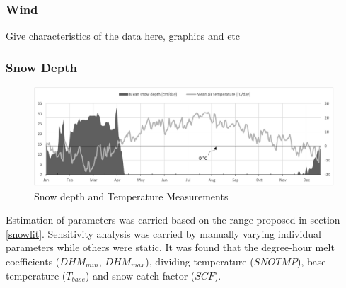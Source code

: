         \subsubsection{Wind}
        Give characteristics of the data here, graphics and etc


\subsubsection{Snow Depth}

\begin{figure}[h]
    \centering
	\includegraphics[scale=0.45]{figures/measuredsnowpack.png}
	\caption{Snow depth and Temperature Measurements \citet{fmidata}}
	\label{fig:snowmeasurement}
\end{figure}
        
Estimation of parameters was carried based on the range proposed in section \ref{snowlit}. Sensitivity analysis was carried by manually varying individual parameters while others were static. It was found that the degree-hour melt coefficients ($DHM_{min}$, $DHM_{max}$), dividing temperature ($SNOTMP$), base temperature ($T_{base}$) and snow catch factor ($SCF$).

